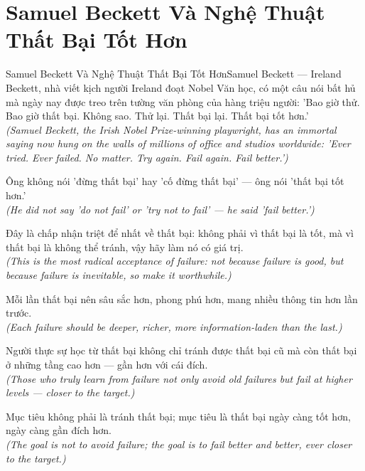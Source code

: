 \section{Samuel Beckett Và Nghệ Thuật Thất Bại Tốt Hơn}
\begin{truyen}{Samuel Beckett Và Nghệ Thuật Thất Bại Tốt Hơn}{Samuel Beckett --- Ireland}
 Beckett, nhà viết kịch người Ireland đoạt Nobel Văn học, có một câu nói bất hủ mà ngày nay được treo trên tường văn phòng của hàng triệu người: 'Bao giờ thử. Bao giờ thất bại. Không sao. Thử lại. Thất bại lại. Thất bại tốt hơn.'\\[4pt]
\textit{(Samuel Beckett, the Irish Nobel Prize-winning playwright, has an immortal saying now hung on the walls of millions of office and studios worldwide: 'Ever tried. Ever failed. No matter. Try again. Fail again. Fail better.')}

Ông không nói 'đừng thất bại' hay 'cố đừng thất bại' --- ông nói 'thất bại tốt hơn.'\\[4pt]
\textit{(He did not say 'do not fail' or 'try not to fail' --- he said 'fail better.')}

Đây là chấp nhận triệt để nhất về thất bại: không phải vì thất bại là tốt, mà vì thất bại là không thể tránh, vậy hãy làm nó có giá trị.\\[4pt]
\textit{(This is the most radical acceptance of failure: not because failure is good, but because failure is inevitable, so make it worthwhile.)}

Mỗi lần thất bại nên sâu sắc hơn, phong phú hơn, mang nhiều thông tin hơn lần trước.\\[4pt]
\textit{(Each failure should be deeper, richer, more information-laden than the last.)}

Người thực sự học từ thất bại không chỉ tránh được thất bại cũ mà còn thất bại ở những tầng cao hơn --- gần hơn với cái đích.\\[4pt]
\textit{(Those who truly learn from failure not only avoid old failures but fail at higher levels --- closer to the target.)}

\end{truyen}
\begin{baihoc}
  Mục tiêu không phải là tránh thất bại; mục tiêu là thất bại ngày càng tốt hơn, ngày càng gần đích hơn.\\[4pt]
  \textit{(The goal is not to avoid failure; the goal is to fail better and better, ever closer to the target.)}
\end{baihoc}

